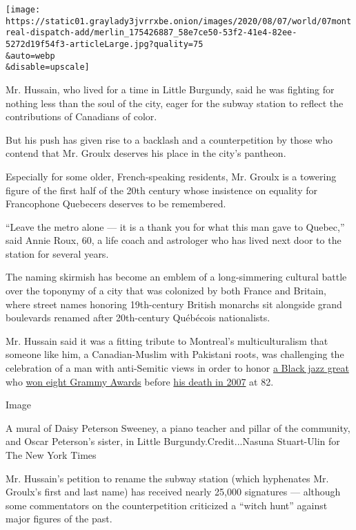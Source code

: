 \texttt{[image: https://static01.graylady3jvrrxbe.onion/images/2020/08/07/world/07montreal-dispatch-add/merlin\_175426887\_58e7ce50-53f2-41e4-82ee-5272d19f54f3-articleLarge.jpg?quality=75\\\&auto=webp\\\&disable=upscale]}

Mr. Hussain, who lived for a time in Little Burgundy, said he was
fighting for nothing less than the soul of the city, eager for the
subway station to reflect the contributions of Canadians of color.

But his push has given rise to a backlash and a counterpetition by those
who contend that Mr. Groulx deserves his place in the city's pantheon.

Especially for some older, French-speaking residents, Mr. Groulx is a
towering figure of the first half of the 20th century whose insistence
on equality for Francophone Quebecers deserves to be remembered.

``Leave the metro alone --- it is a thank you for what this man gave to
Quebec,'' said Annie Roux, 60, a life coach and astrologer who has lived
next door to the station for several years.

The naming skirmish has become an emblem of a long-simmering cultural
battle over the toponymy of a city that was colonized by both France and
Britain, where street names honoring 19th-century British monarchs sit
alongside grand boulevards renamed after 20th-century Québécois
nationalists.

Mr. Hussain said it was a fitting tribute to Montreal's multiculturalism
that someone like him, a Canadian-Muslim with Pakistani roots, was
challenging the celebration of a man with anti-Semitic views in order to
honor
\href{https://www.banffcentre.ca/oscar-peterson-canadian-jazz-legend}{a
Black jazz great} who
\href{https://www.grammy.com/grammys/artists/oscar-peterson/13621}{won
eight Grammy Awards} before
\href{https://www.nytimes3xbfgragh.onion/2007/12/25/arts/25peterson.html}{his
death in 2007} at 82.

Image

A mural of Daisy Peterson Sweeney, a piano teacher and pillar of the
community, and Oscar Peterson's sister, in Little
Burgundy.Credit...Nasuna Stuart-Ulin for The New York Times

Mr. Hussain's petition to rename the subway station (which hyphenates
Mr. Groulx's first and last name) has received nearly 25,000 signatures
--- although some commentators on the counterpetition criticized a
``witch hunt'' against major figures of the past.

